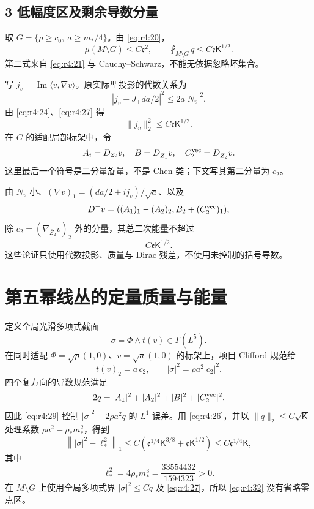 \documentclass[UTF8,11pt,fontset=none]{ctexart}
\begin{document}
\subsection{3 低幅度区及剩余导数分量}\label{ch4:ux4f4eux5e45ux5ea6ux533aux53caux5269ux4f59ux5bfcux6570ux5206ux91cf}

取 \(G=\{\rho\ge c_0,\ a\ge m_*/4\}\)。由 \eqref{eq:r4:20}， \[
\mu(M\setminus G)\le C\mathfrak e^2,
\qquad
\fint_{M\setminus G}q\le C\mathfrak e\mathsf K^{1/2}.
\tag{4.27}\label{eq:r4:27}
\] 第二式来自 \eqref{eq:r4:21} 与 Cauchy--Schwarz，不能无依据忽略坏集合。

写 \(j_v=\operatorname{Im}\langle v,\nabla v\rangle\)。原实际型投影的代数关系为 \[
|j_v+J_+da/2|^2\le2a|N_v|^2.
\] 由 \eqref{eq:r4:24}、\eqref{eq:r4:27} 得 \[
\|j_v\|_2^2\le C\mathfrak e\mathsf K^{1/2}.
\tag{4.28}\label{eq:r4:28}
\] 在 \(G\) 的适配局部标架中，令 \[
A_i=\nabla_{Z_i}v,\quad B=\nabla_{\bar Z_1}v,\quad C_2^{\rm vec}=\nabla_{\bar Z_2}v.
\] 这里最后一个符号是二分量旋量，不是 Chen 类；下文写其第二分量为 \(c_2\)。

由 \(N_v\) 小、\((\nabla v)_1=(da/2+ij_v)/\sqrt a\)、以及 \[
D^-v=((A_1)_1-(A_2)_2,B_2+(C_2^{\rm vec})_1),
\] 除 \(c_2=(\nabla_{\bar Z_2}v)_2\) 外的分量，其总二次能量不超过 \[
C\mathfrak e\mathsf K^{1/2}.
\tag{4.29}\label{eq:r4:29}
\] 这些论证只使用代数投影、质量与 Dirac 残差，不使用未控制的括号导数。

\section{第五幂线丛的定量质量与能量}\label{ch4:ux7b2cux4e94ux5e42ux7ebfux4e1bux7684ux5b9aux91cfux8d28ux91cfux4e0eux80fdux91cf}

定义全局光滑多项式截面 \[
\sigma=\Phi\wedge t(v)\in\Gamma(L^5).
\tag{4.30}\label{eq:r4:30}
\] 在同时适配 \(\Phi=\sqrt\rho(1,0)\)、\(v=\sqrt a(1,0)\) 的标架上，项目 Clifford 规范给 \[
t(v)_2=a\,c_2,
\qquad |\sigma|^2=\rho a^2|c_2|^2.
\tag{4.31}\label{eq:r4:31}
\] 四个复方向的导数规范满足 \[
2q=|A_1|^2+|A_2|^2+|B|^2+|C_2^{\rm vec}|^2.
\] 因此 \eqref{eq:r4:29} 控制 \(|\sigma|^2-2\rho a^2q\) 的 \(L^1\) 误差。用 \eqref{eq:r4:26}，并以 \(\|q\|_2\le C\sqrt{\mathsf K}\) 处理系数 \(\rho a^2-\rho_*m_*^2\)，得到 \[
\left\||\sigma|^2-\ell_*^2\right\|_1
\le C\left(\mathfrak e^{1/4}\mathsf K^{3/8}
+\mathfrak e\mathsf K^{1/2}\right)
\le C\mathfrak e^{1/4}\mathsf K,
\tag{4.32}\label{eq:r4:32}
\] 其中 \[
\ell_*^2=4\rho_*m_*^3=\frac{33554432}{1594323}>0.
\] 在 \(M\setminus G\) 上使用全局多项式界 \(|\sigma|^2\le Cq\) 及 \eqref{eq:r4:27}，所以 \eqref{eq:r4:32} 没有省略零点区。
\end{document}
